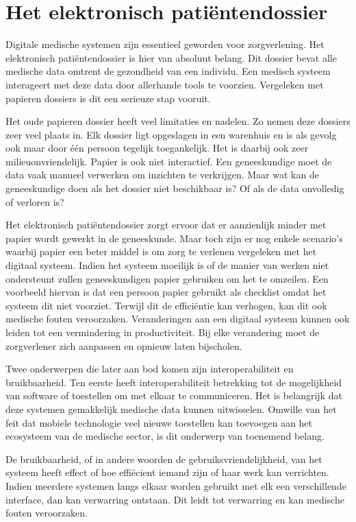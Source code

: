 \documentclass{article}
\begin{document}
\section{Het elektronisch pati\"{e}ntendossier}

Digitale medische systemen zijn essentieel geworden voor zorgverlening. Het elektronisch pati\"{e}ntendossier is hier van absoluut belang. Dit dossier bevat alle medische data omtrent de gezondheid van een individu. Een medisch systeem interageert met deze data door allerhande tools te voorzien. Vergeleken met papieren dossiers is dit een serieuze stap vooruit.

Het oude papieren dossier heeft veel limitaties en nadelen. Zo nemen deze dossiers zeer veel plaats in. Elk dossier ligt opgeslagen in een warenhuis en is als gevolg ook maar door \'{e}\'{e}n persoon tegelijk toegankelijk. Het is daarbij ook zeer milieuonvriendelijk. Papier is ook niet interactief. Een geneeskundige moet de data vaak manueel verwerken om inzichten te verkrijgen. Maar wat kan de geneeskundige doen als het dossier niet beschikbaar is? Of als de data onvolledig of verloren is? 

Het elektronisch pati\"{e}ntendossier zorgt ervoor dat er aanzienlijk minder met papier wordt gewerkt in de geneeskunde. Maar toch zijn er nog enkele scenario's waarbij papier een beter middel is om zorg te verlenen vergeleken met het digitaal systeem. Indien het systeem moeilijk is of de manier van werken niet ondersteunt zullen geneeskundigen papier gebruiken om het te omzeilen. Een voorbeeld hiervan is dat een persoon papier gebruikt als checklist omdat het systeem dit niet voorziet. Terwijl dit de effici\"{e}ntie kan verhogen, kan dit ook medische fouten veroorzaken. Veranderingen aan een digitaal systeem kunnen ook leiden tot een vermindering in productiviteit. Bij elke verandering moet de zorgverlener zich aanpassen en opnieuw laten bijscholen.

Twee onderwerpen die later aan bod komen zijn interoperabiliteit en bruikbaarheid. Ten eerste heeft interoperabiliteit betrekking tot de mogelijkheid van software of toestellen om met elkaar te communiceren. Het is belangrijk dat deze systemen gemakkelijk medische data kunnen uitwisselen. Omwille van het feit dat mobiele technologie veel nieuwe toestellen kan toevoegen aan het ecosysteem van de medische sector, is dit onderwerp van toenemend belang. 

De bruikbaarheid, of in andere woorden de gebruiksvriendelijkheid, van het systeem heeft effect of hoe effi\"{e}cient iemand zijn of haar werk kan verrichten. Indien meerdere systemen langs elkaar worden gebruikt met elk een verschillende interface, dan kan verwarring ontstaan. Dit leidt tot verwarring en kan medische fouten veroorzaken.
\end{document}

